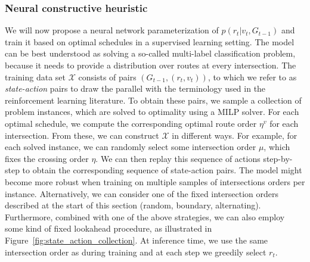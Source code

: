 \documentclass[a4paper]{article}
\theoremstyle{definition}
\theoremstyle{plain}
\begin{document}
\subsubsection{Neural constructive heuristic}
\label{sec:neural_constructive}

We will now propose a neural network parameterization of
$p(r_{t} | v_{t}, G_{t-1})$ and train it based on optimal schedules in a
supervised learning setting. The model can be best understood as solving a
so-called multi-label classification problem, because it needs to provide a
distribution over routes at every intersection.
%
The training data set $\mathcal{X}$ consists of pairs
$(G_{t-1}, (r_{t}, v_{t}))$, to which we refer to as \textit{state-action} pairs
to draw the parallel with the terminology used in the reinforcement learning
literature.
%
To obtain these pairs, we sample a collection of problem instances, which are
solved to optimality using a MILP solver. For each optimal schedule, we compute
the corresponding optimal route order $\eta^{v}$ for each intersection.
%
From these, we can construct $\mathcal{X}$ in different ways.
For example, for each solved instance, we can randomly select some intersection
order $\mu$, which fixes the crossing order $\eta$. We can then replay
this sequence of actions step-by-step to obtain the corresponding sequence of
state-action pairs.
The model might become more robust when training on multiple samples of
intersections orders per instance.
Alternatively, we can consider one of the fixed intersection orders
described at the start of this section (random, boundary, alternating).
Furthermore, combined with one of the above strategies, we can also employ some
kind of fixed lookahead procedure, as illustrated in
Figure~\ref{fig:state_action_collection}.
At inference time, we use the same intersection order as during training and at
each step we greedily select $r_{t}$.

\end{document}
